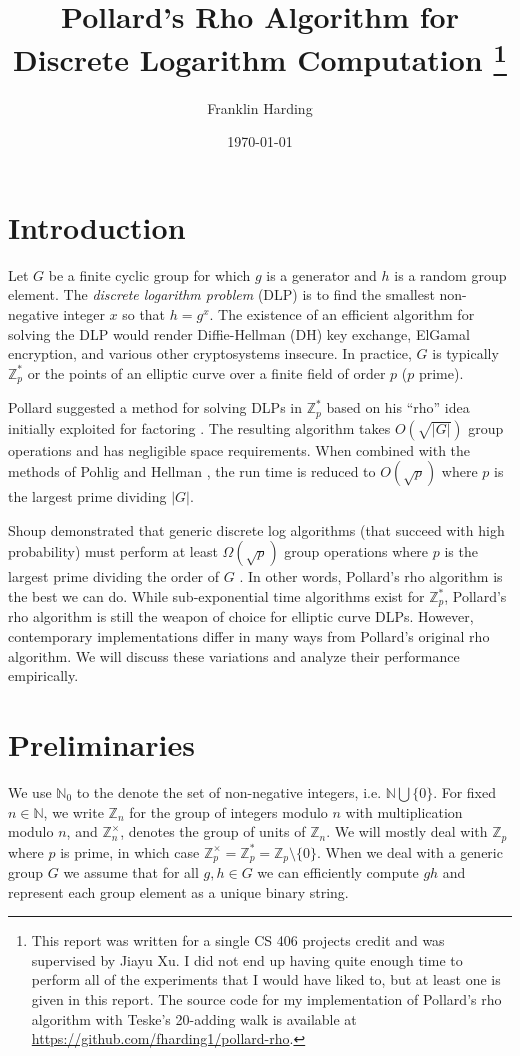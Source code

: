 \documentclass{article}
\title{Pollard's Rho Algorithm for Discrete Logarithm Computation \thanks{This report was written for a single CS 406 projects credit and was supervised by Jiayu Xu. I did not end up having quite enough time to perform all of the experiments that I would have liked to, but at least one is given in this report. The source code for my implementation of Pollard's rho algorithm with Teske's 20-adding walk is available at \href{https://github.com/fharding1/pollard-rho}{https://github.com/fharding1/pollard-rho}.}}
\author{Franklin Harding}
\date{\today}
\newcommand{\ZZ}{\mathbb{Z}}
\newcommand{\NN}{\mathbb{N}}
\begin{document}
\maketitle

\section{Introduction}

Let $G$ be a finite cyclic group for which $g$ is a generator and $h$ is a random group element. The \textit{discrete logarithm problem} (DLP) is to find the smallest non-negative integer $x$ so that $h = g^x$. The existence of an efficient algorithm for solving the DLP would render Diffie-Hellman (DH) key exchange, ElGamal encryption, and various other cryptosystems insecure. In practice, $G$ is typically $\ZZ_p^*$ or the points of an elliptic curve over a finite field of order $p$ ($p$ prime).

Pollard suggested a method for solving DLPs in $\ZZ_p^*$ \cite{Pollard1978} based on his ``rho'' idea initially exploited for factoring \cite{Pollard1975}. The resulting algorithm takes $O(\sqrt{|G|})$ group operations and has negligible space requirements. When combined with the methods of Pohlig and Hellman \cite{Pohlig78}, the run time is reduced to $O(\sqrt{p})$ where $p$ is the largest prime dividing $|G|$.

Shoup demonstrated that generic discrete log algorithms (that succeed with high probability) must perform at least $\Omega(\sqrt{p})$ group operations where $p$ is the largest prime dividing the order of $G$ \cite{Shoup1997}. In other words, Pollard's rho algorithm is the best we can do. While sub-exponential time algorithms exist for $\ZZ_p^*$, Pollard's rho algorithm is still the weapon of choice for elliptic curve DLPs. However, contemporary implementations differ in many ways from Pollard's original rho algorithm. We will discuss these variations and analyze their performance empirically.

\section{Preliminaries}

We use $\NN_0$ to the denote the set of non-negative integers, i.e. $\NN \bigcup \{0\}$. For fixed $n \in \NN$, we write $\ZZ_n$ for the group of integers modulo $n$ with multiplication modulo $n$, and $\ZZ_n^{\times}$, denotes the group of units of $\ZZ_n$. We will mostly deal with $\ZZ_p$ where $p$ is prime, in which case $\ZZ_p^{\times}=\ZZ_p^*=\ZZ_p \setminus \{0\}$. When we deal with a generic group $G$ we assume that for all $g,h \in G$ we can efficiently compute $gh$ and represent each group element as a unique binary string.
\end{document}
